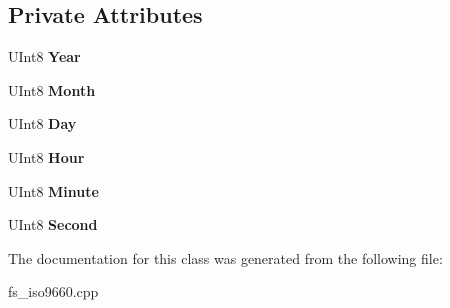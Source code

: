 \subsection*{Private Attributes}
\begin{DoxyCompactItemize}
\item 
\mbox{\label{class_i_s_o9660_driver_1_1_generic_entry_1_1_interim_date_a98d27ab5af20b713612c1c8373331178}} 
U\+Int8 {\bfseries Year}
\item 
\mbox{\label{class_i_s_o9660_driver_1_1_generic_entry_1_1_interim_date_a79a04ce7ac15f3ac1e2b9377723f55d6}} 
U\+Int8 {\bfseries Month}
\item 
\mbox{\label{class_i_s_o9660_driver_1_1_generic_entry_1_1_interim_date_abbc3faf2175f2c7bdde46bcaee7e40ea}} 
U\+Int8 {\bfseries Day}
\item 
\mbox{\label{class_i_s_o9660_driver_1_1_generic_entry_1_1_interim_date_a485ad5cebab5d1254e11384277bbd188}} 
U\+Int8 {\bfseries Hour}
\item 
\mbox{\label{class_i_s_o9660_driver_1_1_generic_entry_1_1_interim_date_ad0b2c1b0597f3c843db413a93acc6ae3}} 
U\+Int8 {\bfseries Minute}
\item 
\mbox{\label{class_i_s_o9660_driver_1_1_generic_entry_1_1_interim_date_a88993ebf63ffd4b94109165ae9c26eb1}} 
U\+Int8 {\bfseries Second}
\end{DoxyCompactItemize}


The documentation for this class was generated from the following file\+:\begin{DoxyCompactItemize}
\item 
fs\+\_\+iso9660.\+cpp\end{DoxyCompactItemize}
